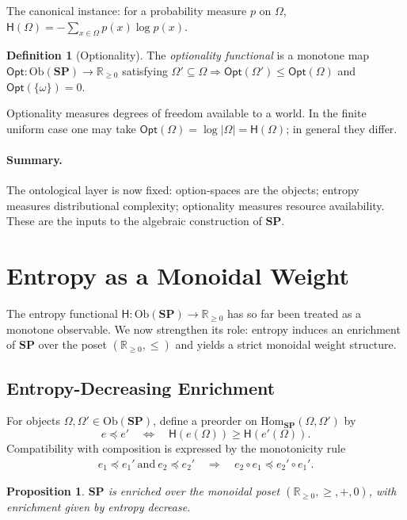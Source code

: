 \documentclass[12pt,a4paper]{article}
\newtheorem{proposition}[theorem]{Proposition}
\theoremstyle{definition}
\newtheorem{definition}[theorem]{Definition}
\theoremstyle{remark}
\newcommand{\Rnn}{\mathbb{R}_{\ge 0}}
\newcommand{\Ent}{\ensuremath{\mathsf{H}}}
\newcommand{\Opt}{\ensuremath{\mathsf{Opt}}}
\newcommand{\SP}{\mathbf{SP}}
\newcommand{\Ob}{\mathrm{Ob}}
\providecommand{\Hom}{\mathrm{Hom}}
\renewcommand{\Hom}{\mathrm{Hom}}
\begin{document}
The canonical instance: for a probability measure $p$ on $\Omega$,
$\Ent(\Omega)=-\sum_{x\in\Omega}p(x)\log p(x)$.

\begin{definition}[Optionality]
\label{def:opt}
The \emph{optionality functional} is a monotone map $\Opt:\Ob(\SP)\to\Rnn$
satisfying $\Omega'\subseteq\Omega\Rightarrow\Opt(\Omega')\le\Opt(\Omega)$ and
$\Opt(\{\omega\})=0$.
\end{definition}

Optionality measures degrees of freedom available to a world. In the finite uniform
case one may take $\Opt(\Omega)=\log|\Omega|=\Ent(\Omega)$; in general they differ.

\paragraph{Summary.} The ontological layer is now fixed: option-spaces are the objects;
entropy measures distributional complexity; optionality measures resource availability.
These are the inputs to the algebraic construction of $\SP$.

\section{Entropy as a Monoidal Weight} \label{sec:entropy-weight}

The entropy functional $\Ent : \Ob(\SP) \to \Rnn$ has so far been treated as a monotone observable. We now strengthen its role: entropy induces an enrichment of $\SP$ over the poset $(\Rnn, \le)$ and yields a strict monoidal weight structure.
\subsection{Entropy-Decreasing Enrichment}

For objects $\Omega,\Omega'\in\Ob(\SP)$, define a preorder on $\Hom_{\SP}(\Omega,\Omega')$ by
\[
e \preceq e' \quad \Longleftrightarrow \quad \Ent(e(\Omega)) \ge \Ent(e'(\Omega)).
\]
Compatibility with composition is expressed by the monotonicity rule
\begin{align*}
e_1 \preceq e_1' \ \text{and}\ e_2 \preceq e_2'
\quad \Longrightarrow \quad
e_2\circ e_1 \preceq e_2'\circ e_1'.
\end{align*}

\begin{proposition}
$\SP$ is enriched over the monoidal poset $(\Rnn,\ge,+,0)$, with enrichment given by entropy decrease.
\end{proposition}
\end{document}
